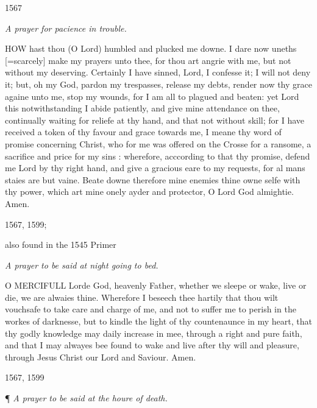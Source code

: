 1567

\emph{A
prayer for pacience in trouble.}

HOW
hast thou (O Lord) humbled and plucked me downe. I dare now uneths [=scarcely]
make my prayers unto thee, for thou art angrie with me, but not without
my deserving. Certainly I have sinned, Lord, I confesse it; I will not
deny it; but, oh my God, pardon my trespasses, release my debts, render
now thy grace againe unto me, stop my wounds, for I am all to plagued
and beaten: yet Lord this notwithstanding I abide patiently, and give
mine attendance on thee, continually waiting for reliefe at thy hand,
and that not without skill; for I have received a token of thy favour
and grace towards me, I meane thy word of promise concerning Christ, who
for me was offered on the Crosse for a ransome, a sacrifice and price
for my sins : wherefore, acccording to that thy promise, defend me Lord
by thy right hand, and give a gracious eare to my requests, for al mans
staies are but vaine. Beate downe therefore mine enemies thine owne selfe
with thy power, which art mine onely ayder and protector, O Lord God almightie.
Amen.

1567,
1599;

also found in the 1545 Primer

\emph{A
prayer to be said at night going to bed.}

O
MERCIFULL Lorde God, heavenly Father, whether we sleepe or wake, live
or die, we are alwaies thine. Wherefore I beseech thee hartily that thou
wilt vouchsafe to take care and charge of me, and not to suffer me to
perish in the workes of darknesse, but to kindle the light of thy countenaunce
in my heart, that thy godly knowledge may daily increase in mee, through
a right and pure faith, and that I may alwayes bee found to wake and live
after thy will and pleasure, through Jesus Christ our Lord and Saviour.
Amen.

1567,
1599

¶
\emph{A prayer to be said at the houre of death.}

